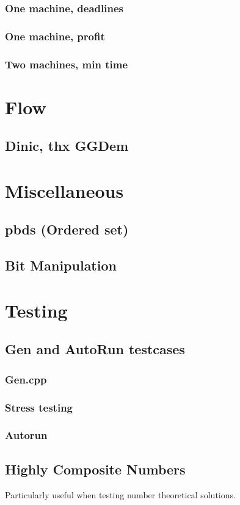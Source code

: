 \subsubsection{One machine, deadlines}
\subsubsection{One machine, profit}
\subsubsection{Two machines, min time}

\section{Flow}
\subsection{Dinic, thx GGDem}

\section{Miscellaneous}
\subsection{pbds (Ordered set)}
\subsection{Bit Manipulation}


\section{Testing}
\subsection{Gen and AutoRun testcases}
\subsubsection{Gen.cpp}
\subsubsection{Stress testing}

\subsubsection{Autorun}

\subsection{Highly Composite Numbers}
Particularly useful when testing number theoretical solutions.





